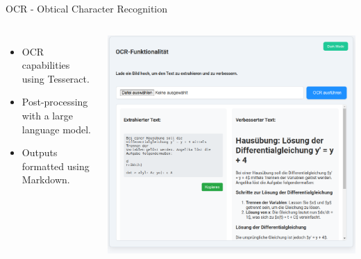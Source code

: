 \documentclass{beamer}
\begin{document}
\begin{frame}{OCR - Obtical Character Recognition}
  \begin{columns}
      \begin{itemize}
        \item OCR capabilities using Tesseract.
        \item Post-processing with a large language model.
        \item Outputs formatted using Markdown.
      \end{itemize}
      \centering
      \includegraphics[width=\textwidth]{OCR-functonalatie.png}
  \end{columns}
\end{frame}
\end{document}
